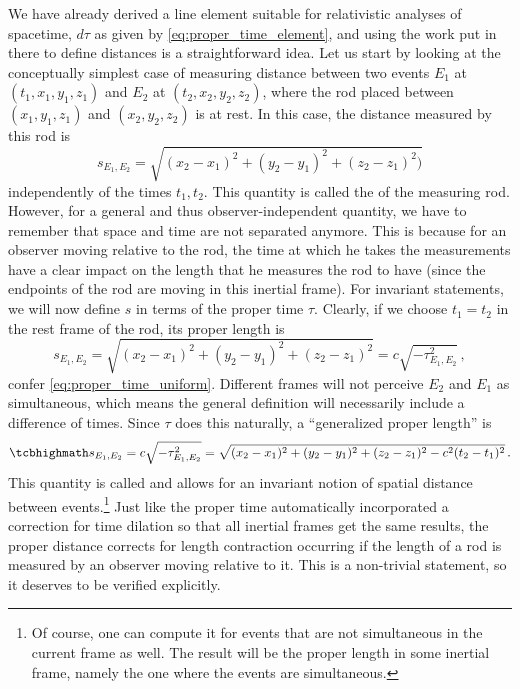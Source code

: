 \documentclass[../relativity_main.tex]{subfiles}
\begin{document}
We have already derived a line element suitable for relativistic analyses of spacetime, $d\tau$ as given by \eqref{eq:proper_time_element}, and using the work put in there to define distances is a straightforward idea. Let us start by looking at the conceptually simplest case of measuring distance between two events $E_1$ at $(t_1, x_1, y_1, z_1)$ and $E_2$ at $(t_2, x_2, y_2, z_2)$, where the rod placed between $(x_1, y_1, z_1)$ and $(x_2, y_2, z_2)$ is at rest. In this case, the distance measured by this rod is
\begin{equation}\label{eq:proper_length}
	s_{E_1, E_2} = \sqrt{(x_2 - x_1)^2 + (y_2 - y_1)^2 + (z_2 - z_1)^2)}
\end{equation}
independently of the times $t_1, t_2$. This quantity is called the  of the measuring rod. However, for a general and thus observer-independent quantity, we have to remember that space and time are not separated anymore. This is because for an observer moving relative to the rod, the time at which he takes the measurements have a clear impact on the length that he measures the rod to have (since the endpoints of the rod are moving in this inertial frame). For invariant statements, we will now define $s$ in terms of the proper time $\tau$. Clearly, if we choose $t_1 = t_2$ in the rest frame of the rod, its proper length is
\begin{equation*}
	s_{E_1, E_2} = \sqrt{(x_2 - x_1)^2 + (y_2 - y_1)^2 + (z_2 - z_1)^2} = c \sqrt{- \tau_{E_1, E_2}^2} \, ,
\end{equation*}
confer \eqref{eq:proper_time_uniform}. Different frames will not perceive $E_2$ and $E_1$ as simultaneous, which means the general definition will necessarily include a difference of times. Since $\tau$ does this naturally, a \enquote{generalized proper length} is
\begin{equation}\label{eq:proper_distance_uniform}
	\eqbox{
	s_{E_1, E_2} = c \sqrt{- \tau_{E_1, E_2}^2} = \sqrt{(x_2 - x_1)^2 + (y_2 - y_1)^2 + (z_2 - z_1)^2 - c^2 (t_2 - t_1)^2}
	}\, .
\end{equation}
This quantity is called  and allows for an invariant notion of spatial distance between events.\footnote{Of course, one can compute it for events that are not simultaneous in the current frame as well. The result will be the proper length in some inertial frame, namely the one where the events are simultaneous.} Just like the proper time automatically incorporated a correction for time dilation so that all inertial frames get the same results, the proper distance corrects for length contraction occurring if the length of a rod is measured by an observer moving relative to it. This is a non-trivial statement, so it deserves to be verified explicitly.
\end{document}
